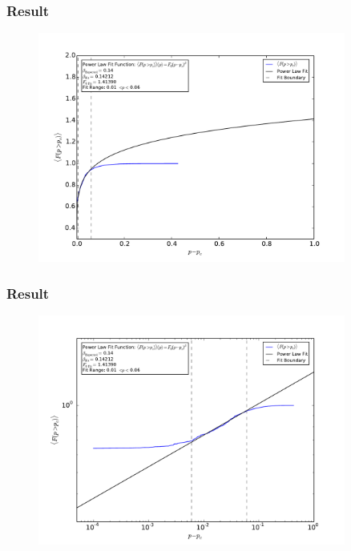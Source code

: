 \documentclass[mathserif,18pt,xcolor=table]{beamer}
\begin{document}
\begin{frame}
	\frametitle{Result}
	\begin{figure}
  	\centering
  	\includegraphics[width=0.9\textwidth]{../output/plots_for_paper/F_ave_vs_p_linearScale.pdf}
	\end{figure}
\end{frame}


\begin{frame}
	\frametitle{Result}
	\begin{figure}
  	\centering
  	\includegraphics[width=0.9\textwidth]{../output/plots_for_paper/F_ave_vs_p.pdf}
	\end{figure}
\end{frame}
\end{document}
